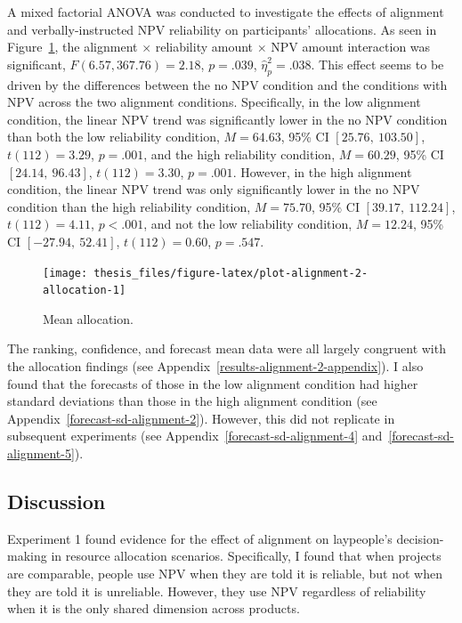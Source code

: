 \documentclass[a4paper, nobind, dvipsnames]{templates/ociamthesis}
\theoremstyle{definition}
\theoremstyle{definition}
\theoremstyle{definition}
\theoremstyle{definition}
\theoremstyle{remark}
\begin{document}
A mixed factorial ANOVA was conducted to investigate the effects of alignment
and verbally-instructed NPV reliability on participants' allocations. As seen in
Figure~\ref{fig:plot-alignment-2-allocation}, the alignment \(\times\)
reliability amount \(\times\) NPV amount interaction was significant,
\(F(6.57, 367.76) = 2.18\), \(p = .039\), \(\hat{\eta}^2_p = .038\). This
effect seems to be driven by the differences between the no NPV condition and
the conditions with NPV across the two alignment conditions. Specifically, in
the low alignment condition, the linear NPV trend was significantly lower in the
no NPV condition than both the low reliability condition,
\(M = 64.63\), 95\% CI \([25.76,~103.50]\), \(t(112) = 3.29\), \(p = .001\), and the high
reliability condition, \(M = 60.29\), 95\% CI \([24.14,~96.43]\), \(t(112) = 3.30\), \(p = .001\).
However, in the high alignment condition, the linear NPV trend was only
significantly lower in the no NPV condition than the high reliability condition,
\(M = 75.70\), 95\% CI \([39.17,~112.24]\), \(t(112) = 4.11\), \(p < .001\), and not the low
reliability condition, \(M = 12.24\), 95\% CI \([-27.94,~52.41]\), \(t(112) = 0.60\), \(p = .547\).



\begin{figure}
\texttt{[image: thesis\_files/figure-latex/plot-alignment-2-allocation-1]} \caption{Mean allocation.}\label{fig:plot-alignment-2-allocation}
\end{figure}

The ranking, confidence, and forecast mean data were all largely congruent with
the allocation findings (see Appendix~\ref{results-alignment-2-appendix}). I
also found that the forecasts of those in the low alignment condition had higher
standard deviations than those in the high alignment condition (see
Appendix~\ref{forecast-sd-alignment-2}). However, this did not replicate in
subsequent experiments (see Appendix~\ref{forecast-sd-alignment-4}
and~\ref{forecast-sd-alignment-5}).

\subsection{Discussion}

Experiment 1 found evidence for the effect of alignment on laypeople's
decision-making in resource allocation scenarios. Specifically, I found that
when projects are comparable, people use NPV when they are told it is reliable,
but not when they are told it is unreliable. However, they use NPV regardless of
reliability when it is the only shared dimension across products.
\end{document}
